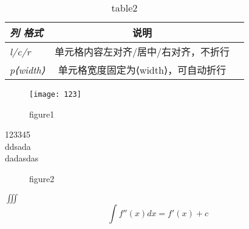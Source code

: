\documentclass{zxhClass}
\begin{document}
\begin{table}[htbp]
	\begin{flushright}
		\begin{tabular}{>{\itshape}l<{}cc}
			\toprule
			列 格式      &    说明&\\
			\midrule
			l/c/r       &   单元格内容左对齐/居中/右对齐，不折行&\\
			p{⟨width⟩}  &   单元格宽度固定为⟨width⟩，可自动折行&\\
			\bottomrule
		\end{tabular}
		\caption{table2}
	\end{flushright}
\end{table}


\begin{figure}[htbp]
	\centering
		\texttt{[image: 123]}	
	\caption{figure1}
\end{figure}

123345\\ddsada\\
dadasdas\\

\begin{figure}[htbp]
	\centering
	\subfloat[12321]{\texttt{[image: 123]}}	
	\subfloat[32123]{\texttt{[image: 123]}}	
	\caption{figure2}
\end{figure}

$ \iiint $
\begin{equation}
	\int f''(x) dx = f'(x) + c
\end{equation}
\end{document}
